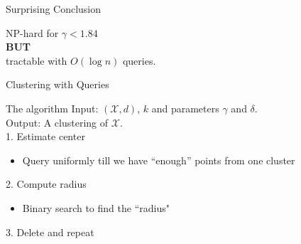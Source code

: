 \documentclass{beamer}
\newcommand{\mc}{\mathcal}
\begin{document}
\begin{frame}{Surprising Conclusion}

    \begin{block}{}
    \begin{center}{\Large NP-hard for $\gamma<1.84$\\
      \vspace{0.2cm}\textbf{BUT} \\
      \vspace{0.3cm}tractable with $O(\log n)$ queries.}
    \end{center}
    \end{block}
\end{frame}

\begin{frame}{Clustering with Queries}
  \begin{block}{The algorithm}
	\vspace{0.2cm}Input: $(\mc X, d)$, $k$ and parameters $\gamma$ and $\delta$.\\
    \vspace{0.2cm}Output: A clustering of $\mc X$.\\
	\vspace{0.4cm}
	1. Estimate center\\
	\begin{itemize}
		\item Query uniformly till we have ``enough'' points from one cluster
    \end{itemize}  
	\vspace{0.4cm}
	2. Compute radius\\
	\begin{itemize}
	  \vspace{0.2cm}
	  \item Binary search to find the ``radius"
    \end{itemize}  
	\vspace{0.4cm}
	3. Delete and repeat
  \end{block}
\end{frame}
\end{document}
